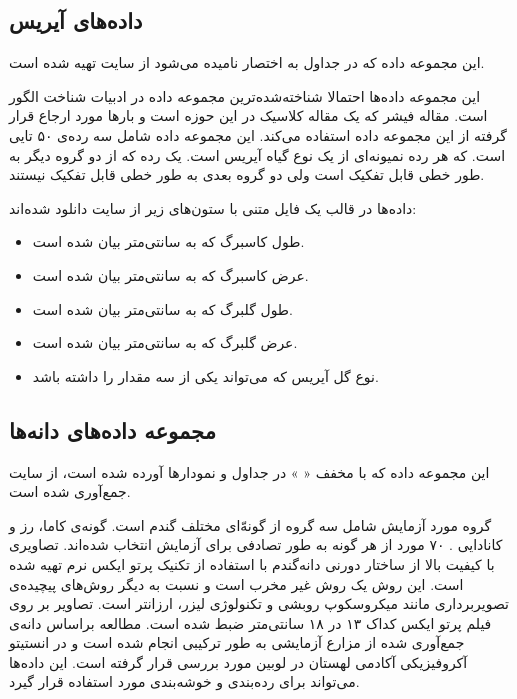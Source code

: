 \subsection{
داده‌های آیریس
}

این مجموعه داده که در جداول به اختصار 
نامیده می‌شود از سایت 
\cite{uci_iris}
تهیه شده است.

این مجموعه داده‌ها احتمالا شناخته‌شده‌ترین مجموعه داده در ادبیات شناخت الگور%
است. مقاله فیشر که یک مقاله کلاسیک در این حوزه است و بارها مورد ارجاع قرار گرفته از این مجموعه داده استفاده می‌کند. این مجموعه داده شامل سه رده‌ی ۵۰ تایی است. که هر رده نمیونه‌ای از یک نوع گیاه آیریس است. یک رده که از دو گروه دیگر به طور خطی قابل تفکیک است ولی دو گروه بعدی به طور خطی قابل تفکیک نیستند.

داده‌ها در قالب یک فایل متنی با ستون‌های زیر از سایت 
دانلود شده‌اند:

\begin{itemize}
\item
{}
طول کاسبرگ که به سانتی‌متر بیان شده است.
\item
{}
عرض کاسبرگ که به سانتی‌متر بیان شده است.
\item
{}
طول گلبرگ که به سانتی‌متر بیان شده است.
\item
{}
عرض گلبرگ که به سانتی‌متر بیان شده است.
\item
{}
نوع گل آیریس که می‌تواند یکی از سه مقدار 
را داشته باشد.
\end{itemize}

\subsection{
مجموعه داده‌های دانه‌ها
}

این مجموعه داده که با مخفف «%
%
» در جداول و نمودارها آورده شده است، از سایت 
\cite{uci_seeds}
جمع‌آوری شده است.

گروه مورد آزمایش شامل سه گروه از گونه‌ّای مختلف گندم است. گونه‌ی کاما، رز و کانادایی%
%
. ۷۰ مورد از هر گونه به طور تصادفی برای آزمایش انتخاب شده‌اند. تصاویری با کیفیت بالا از ساختار دورنی دانه‌گندم با استفاده از تکنیک پرتو ایکس نرم%
تهیه شده است. این روش یک روش غیر مخرب است و نسبت به دیگر روش‌های پیچیده‌ی تصویربرداری مانند میکروسکوپ روبشی و تکنولوژی لیزر، ارزانتر است. تصاویر بر روی فیلم پرتو ایکس کداک ۱۳ در ۱۸ سانتی‌متر ضبط شده است. مطالعه براساس دانه‌ی جمع‌آوری شده از مزارع آزمایشی به طور ترکیبی انجام شده است و در انستیتو آکروفیزیکی آکادمی لهستان در لوبین مورد بررسی قرار گرفته است.%
این داده‌ها می‌تواند برای رده‌بندی و خوشه‌بندی مورد استفاده قرار گیرد.

